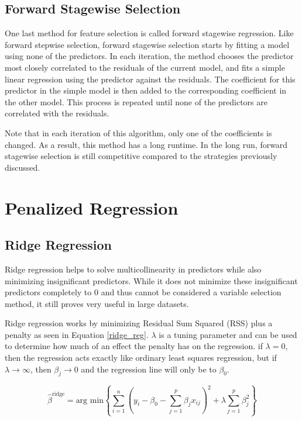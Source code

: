 \documentclass{article}
\newcommand{\argmin}{\text{arg min}}
\begin{document}
\subsection{Forward Stagewise Selection}
One last method for feature selection is called forward stagewise regression. Like forward stepwise selection, forward stagewise selection starts by fitting a model using none of the predictors. In each iteration, the method chooses the predictor most closely correlated to the residuals of the current model, and fits a simple linear regression using the predictor against the residuals. The coefficient for this predictor in the simple model is then added to the corresponding coefficient in the other model. This process is repeated until none of the predictors are correlated with the residuals.

Note that in each iteration of this algorithm, only one of the coefficients is changed. As a result, this method has a long runtime. In the long run, forward stagewise selection is still competitive compared to the strategies previously discussed.

\section{Penalized Regression}
\subsection{Ridge Regression}
Ridge regression helps to solve multicollinearity in predictors while also minimizing insignificant predictors. While it does not minimize these insignificant predictors completely to 0 and thus cannot be considered a variable selection method, it still proves very useful in large datasets.

Ridge regression works by minimizing Residual Sum Squared (RSS) plus a penalty as seen in Equation \ref{ridge_reg}. $\lambda$ is a tuning parameter and can be used to determine how much of an effect the penalty has on the regression. if $\lambda=0$, then the regression acts exactly like ordinary least squares regression, but if $\lambda \rightarrow \infty$, then $\beta_j \rightarrow 0$ and the regression line will only be to $\beta_0$.

\begin{equation}
	\hat{\beta}^{\text{ridge}} = \argmin\left\{ \sum_{i=1}^{n} \left( y_i - \beta_0 - \sum_{j=1}^{p} \beta_jx_{ij} \right)^2 + \lambda \sum_{j=1}^{p} \beta_j^2 \right\}
	\label{ridge_reg}
\end{equation}
\end{document}
